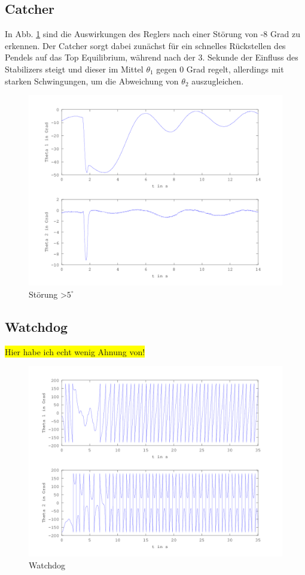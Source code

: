 \subsection{Catcher}
In Abb. \ref{fig.Catcher-Plot} sind die Auswirkungen des Reglers nach einer Störung von -8 Grad zu erkennen. Der Catcher sorgt dabei zunächst für ein schnelles Rückstellen des Pendels auf das Top Equilibrium, während nach der 3. Sekunde der Einfluss des Stabilizers steigt und dieser im Mittel $\theta_1$ gegen 0 Grad regelt, allerdings mit starken Schwingungen, um die Abweichung von $\theta_2$ auszugleichen. 
\begin{figure}[htbp]
	\label{fig.Catcher-Plot}
	\centering
	\includegraphics[width=1.\textwidth]{Grafiken/Catch_kurz.png}
	\caption{Störung \textgreater $5^{\circ}$}
\end{figure}

\subsection{Watchdog}
\colorbox{yellow}{Hier habe ich echt wenig Ahnung von!}
\begin{figure}[htbp]
	\label{fig.Watchdog-Plot}
	\centering
	\includegraphics[width=1.\textwidth]{Grafiken/Watchdog_lang.png}
	\caption{Watchdog}

\end{figure}


